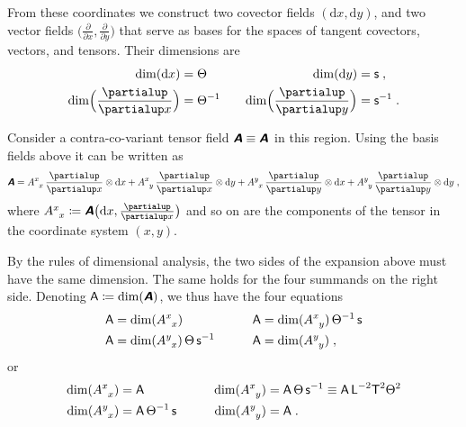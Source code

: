 \documentclass[\ifafour a4paper,12pt,\else a5paper,10pt,\fi%
onecolumn,oneside,article,%
british%
]{memoir}
\makeatletter
\theoremstyle{remark}
\theoremstyle{innote}
\newcommand*{\mathte}[1]{\textbf{\textit{\textsf{#1}}}}
\newcommand*{\de}{\partialup}%
\newcommand*{\di}{\mathrm{d}}%
\newcommand*{\defd}{\coloneqq}
\renewcommand*{\|}[1][]{\nonscript\,#1\vert\nonscript\;\mathopen{}}
\newcommand*{\q}{}%
\DeclareRobustCommand*{\q}{%
  \mathbin{\mathpalette\bigcdot@{}}%
}
\newcommand*{\bigcdot@scalefactor}{0.7}
\newcommand*{\bigcdot@widthfactor}{1.5}
\newcommand*{\bigcdot@}[2]{%
  \sbox0{$#1\vcenter{}$}%
  \sbox2{$#1\cdot\m@th$}%
  \hbox to \bigcdot@widthfactor\wd2{%
    \hfil
    \raise\ht0\hbox{%
      \scalebox{\bigcdot@scalefactor}{%
        \lower\ht0\hbox{$#1\bullet\m@th$}%
      }%
    }%
    \hfil
  }%
}
\newcommand*{\Le}{\textsf{L}}
\newcommand*{\Ti}{\textsf{T}}
\newcommand*{\Te}{\Theta}
\newcommand*{\Ent}{\textsf{s}}
\newcommand*{\Aa}{\textsf{A}}
\newcommand*{\yA}{\mathte{A}}
\renewcommand*{\i}{\indices}
\newcommand*{\dex}[1][i]{\frac{\de}{\de x^{#1}}}
\newcommand*{\dix}[1][i]{\di x^{#1}}
\makeatother
\begin{document}
From these coordinates we construct two covector fields $(\di x, \di y)$,
and two vector fields $\bigl(\frac{\de}{\de x}, \frac{\de}{\de y}\bigr)$
that serve as bases for the spaces of tangent covectors, vectors, and
tensors. Their dimensions are
\begin{equation}
  \label{eq:example_basisvects2d}
  \begin{aligned}
  \dim(\di x)&=\Te &\quad
                        \dim(\di y)&= \Ent \;,
                                     \\
  \dim\Bigl(\frac{\de}{\de x}\Bigr)&=\Te^{-1} &\quad
                        \dim\Bigl(\frac{\de}{\de y}\Bigr)&= \Ent^{-1} \;.
  \end{aligned}
\end{equation}


Consider a contra-co-variant tensor field $\yA \equiv \yA\i{^{\q}_{\q}}$ in
this region. Using the basis fields above it can be written as
\begin{equation}
  \label{eq:expansion_tensor_2d}
  \yA = %
  A\i{^{x}_{x}}\,\frac{\de}{\de x} \otimes\di x + 
  A\i{^{x}_{y}}\,\frac{\de}{\de x} \otimes\di y + 
  A\i{^{y}_{x}}\,\frac{\de}{\de y} \otimes\di x + 
  A\i{^{y}_{y}}\,\frac{\de}{\de y} \otimes\di y \;,
\end{equation}
where $A\i{^{x}_{x}} \defd \yA\bigl(\di x, \frac{\de}{\de x}\bigr)$ and so
on are the components of the tensor in the coordinate system $(x, y)$.

By the rules of dimensional analysis, the two sides of the expansion above
must have the same dimension. The same holds for the four summands on the
right side. Denoting $\Aa \defd \dim(\yA)$, we thus have the four equations
\begin{equation*}
  \label{eq:four_dims_2d_pre}
  \begin{aligned}
    \Aa &= \dim(A\i{^{x}_{x}}) &\qquad \Aa &=
 \dim(A\i{^{x}_{y}})\,\Te^{-1}\,\Ent 
 \\
    \Aa &= \dim(A\i{^{y}_{x}})\,\Te\,\Ent^{-1} &\qquad \Aa &=
 \dim(A\i{^{y}_{y}}) \;,
  \end{aligned}
\end{equation*}
or
\begin{equation}
  \label{eq:four_dims_2d}
  \begin{aligned}
    \dim(A\i{^{x}_{x}}) &= \Aa\, &\qquad 
 \dim(A\i{^{x}_{y}}) &=\Aa\,\Te\,\Ent^{-1} \equiv
\Aa\,\Le^{-2}\Ti^{2}\Te^{2}
    \\
    \dim(A\i{^{y}_{x}}) &= \Aa\,\Te^{-1}\,\Ent &\qquad
 \dim(A\i{^{y}_{y}}) &= \Aa \;.
  \end{aligned}
\end{equation}
\end{document}
